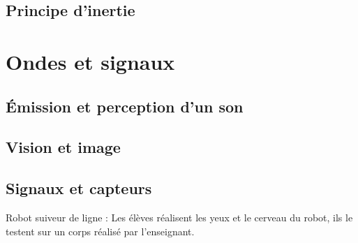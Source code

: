 \documentclass[12pt,a4paper]{article}
\begin{document}
\subsection*{Principe d'inertie}

\section*{Ondes et signaux}
\subsection*{Émission et perception d'un son}
\subsection*{Vision et image}
\subsection*{Signaux et capteurs}

Robot suiveur de ligne :
Les élèves réalisent les yeux et le cerveau du robot, ils le testent sur un corps réalisé par l'enseignant.
\end{document}
